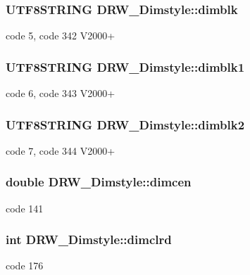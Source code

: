 \subsubsection[{dimblk}]{\setlength{\rightskip}{0pt plus 5cm}U\+T\+F8\+S\+T\+R\+I\+N\+G D\+R\+W\+\_\+\+Dimstyle\+::dimblk}\label{class_d_r_w___dimstyle_a2f64034b5654fee47038933c565a2e51}
code 5, code 342 V2000+ \hypertarget{class_d_r_w___dimstyle_a33a57c5c614537649e042eef57a03f9d}{}
\subsubsection[{dimblk1}]{\setlength{\rightskip}{0pt plus 5cm}U\+T\+F8\+S\+T\+R\+I\+N\+G D\+R\+W\+\_\+\+Dimstyle\+::dimblk1}\label{class_d_r_w___dimstyle_a33a57c5c614537649e042eef57a03f9d}
code 6, code 343 V2000+ \hypertarget{class_d_r_w___dimstyle_a65761962dbaff5d150f4a9296efeadfc}{}
\subsubsection[{dimblk2}]{\setlength{\rightskip}{0pt plus 5cm}U\+T\+F8\+S\+T\+R\+I\+N\+G D\+R\+W\+\_\+\+Dimstyle\+::dimblk2}\label{class_d_r_w___dimstyle_a65761962dbaff5d150f4a9296efeadfc}
code 7, code 344 V2000+ \hypertarget{class_d_r_w___dimstyle_a3b2ea8efe76c60db85c14dcc8724a7f6}{}
\subsubsection[{dimcen}]{\setlength{\rightskip}{0pt plus 5cm}double D\+R\+W\+\_\+\+Dimstyle\+::dimcen}\label{class_d_r_w___dimstyle_a3b2ea8efe76c60db85c14dcc8724a7f6}
code 141 \hypertarget{class_d_r_w___dimstyle_ae1768dfc1e5a2986125affd928cc1278}{}
\subsubsection[{dimclrd}]{\setlength{\rightskip}{0pt plus 5cm}int D\+R\+W\+\_\+\+Dimstyle\+::dimclrd}\label{class_d_r_w___dimstyle_ae1768dfc1e5a2986125affd928cc1278}
code 176 \hypertarget{class_d_r_w___dimstyle_ad603cb462dc00136ff50933979b0aab7}{}
